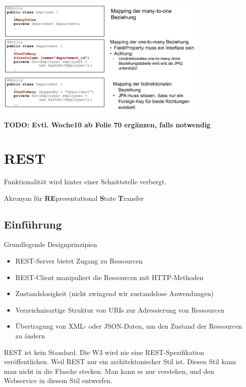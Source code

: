 \documentclass{report}
\newenvironment{Figure}
	{\par\medskip\noindent\minipage{\linewidth}}
	{\endminipage\par\medskip}
\theoremstyle{definition}
\theoremstyle{example}
\begin{document}
\begin{Figure}
\centering
\includegraphics[width=400px]{img/ParentChildBeziehung.png}
	\label{fig:Parent-Child Beziehung}
\end{Figure}

\textbf{TODO: Evtl. Woche10 ab Folie 70 ergänzen, falls notwendig}

\chapter{REST}
Funktionalität wird hinter einer Schnittstelle verbergt.

Akronym für \textbf{RE}presentational \textbf{S}tate \textbf{T}ransfer

\section{Einführung}
Grundlegende Designprinzipien
\begin{itemize}
\item REST-Server bietet Zugang zu Ressourcen
\item REST-Client manipuliert die Ressourcen mit HTTP-Methoden
\item Zustandslosigkeit (nicht zwingend wir zustandslose Anwendungen)
\item Verzeichnisartige Struktur von URIs zur Adressierung von Ressourcen
\item Übertragung von XML- oder JSON-Daten, um den Zustand der Ressourcen zu ändern

\end{itemize}

REST ist kein Standard. Die W3 wird nie eine REST-Spezifikation veröffentlichen.
Weil REST nur ein architektonischer Stil ist. Diesen Stil kann man nicht in die Flasche stecken.
Man kann es nur verstehen, und den Webservice in diesem Stil entwerfen.\\
\end{document}
